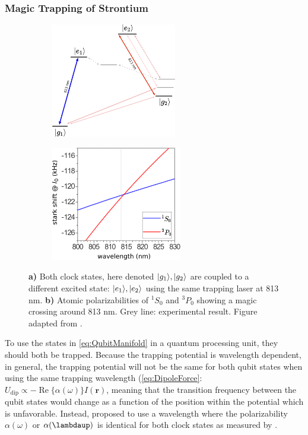 \subsubsection*{Magic Trapping of Strontium}\label{sec:Magic}

\begin{figure}
\centering
	\begin{subfigure}{.4\textwidth}
		\centering
		\includegraphics[height=5cm]{figures/2groundTweezer.pdf}
		\caption{}
		\label{fig:2LevelTweezer}
	\end{subfigure}
	\begin{subfigure}{.5\textwidth}
		\centering
		\includegraphics[height=5cm]{figures/Magic.pdf}
		\caption{}
		\label{fig:BoydMagic}
	\end{subfigure}
	\caption{\textbf{a)} Both clock states, here denoted $\lvert g_1\rangle, \lvert g_2\rangle$ are coupled to a different excited state: $\lvert e_1\rangle, \lvert e_2\rangle$ using the same trapping laser at 813 nm.
	\textbf{ b)} Atomic polarizabilities of ${}^1S_0$ and ${}^3P_0$ showing a magic crossing around 813 nm. 
	Grey line: experimental result. 
	Figure adapted from \cite{Boyd2007}.}
	\label{fig:GerschbergSaxton}
\end{figure}

To use the states in \cref{eq:QubitManifold} in a quantum processing unit, they should both be trapped.
Because the trapping potential is wavelength dependent, in general, the trapping potential will not be the same for both qubit states when using the same trapping wavelength (\cref{eq:DipoleForce}: $U_{\text{dip}} \propto - \operatorname{Re}\{\alpha(\omega)\} I(\mathbf{r})$, meaning that the transition frequency between the qubit states would change as a function of the position within the potential which is unfavorable. 
Instead, \cite{Katori2003} proposed to use a wavelength where the polarizability $\alpha(\omega)$ or $\alpha(\lambdaup)$ is identical for both clock states as measured by \cite{Takamoto2005,Jun2008}.

